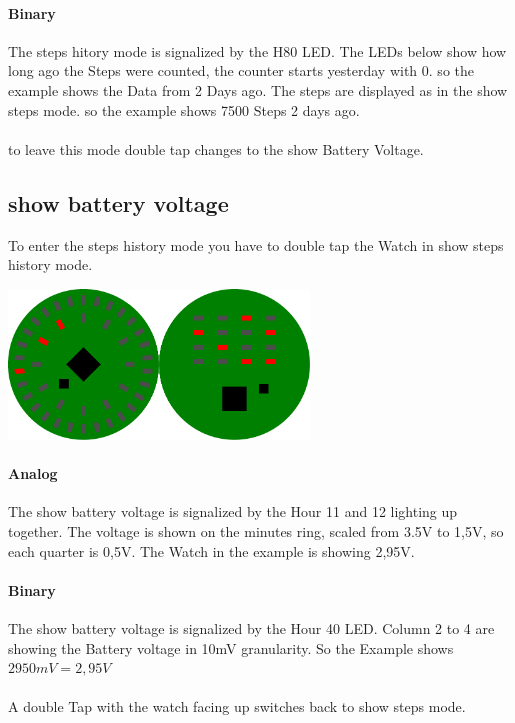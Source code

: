 \paragraph{Binary}
The steps hitory mode is signalized by the H80 LED. The LEDs below show how long ago the Steps were counted, the counter starts yesterday with 0. so the example shows the Data from 2 Days ago. The steps are displayed as in the show steps mode. so the example shows 7500 Steps 2 days ago.\\
\\
to leave this mode double tap changes to the show Battery Voltage.
\subsection{show battery voltage}
To enter the steps history mode you have to double tap the Watch in show steps history mode.
\begin{center}
\includegraphics[width=0.6\textwidth]{../Graphics/ShowUBatt_2950mV}
\end{center}
\paragraph{Analog}
The show battery voltage is signalized by the Hour 11 and 12 lighting up together. The voltage is shown on the minutes ring, scaled from 3.5V to 1,5V, so each quarter is 0,5V. The Watch in the example is showing 2,95V.

\paragraph{Binary}
The show battery voltage is signalized by the Hour 40 LED. Column 2 to 4 are showing the Battery voltage in 10mV granularity. So the Example shows $2950mV=2,95V$\\
\\
A double Tap with the watch facing up switches back to show steps mode.